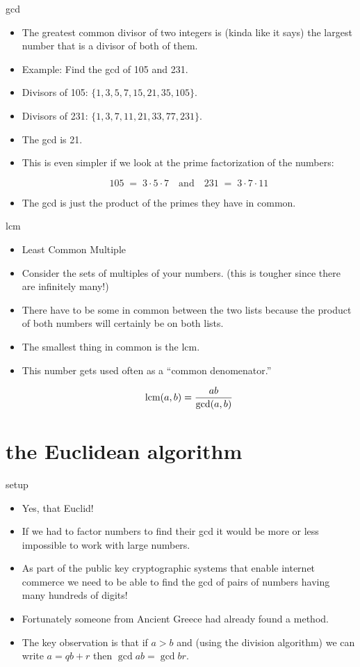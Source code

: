 \documentclass[landscape]{beamer}
\begin{document}
\begin{frame}{gcd}
\begin{itemize}
\item The greatest common divisor of two integers is (kinda like it says) the largest number that is a divisor of both of them. \pause
\item Example: Find the gcd of 105 and 231.\pause 
\item Divisors of 105: $\{1, 3, 5, 7, 15, 21, 35, 105 \}$.
\item Divisors of 231: $\{1, 3, 7, 11, 21, 33, 77, 231 \}$. \pause
\item The gcd is 21. \pause
\item This is even simpler if we look at the prime factorization of the numbers:

\[ 105 \; = \; 3 \cdot 5 \cdot 7 \quad \mbox{and} \quad 231 \; = \; 3 \cdot 7 \cdot 11 \]
\pause 
\item The gcd is just the product of the primes they have in common.
\end{itemize}
\end{frame}

\begin{frame}{lcm}
\begin{itemize}
\item Least Common Multiple\pause
\item Consider the sets of multiples of your numbers. (this is tougher since there are infinitely many!)\pause 
\item There have to be some in common between the two lists because the product of both numbers will certainly be on both lists.\pause
\item The smallest thing in common is the lcm.\pause
\item This number gets used often as a ``common denomenator.'' \pause

\[ \mbox{lcm} (a, b) = \frac{ab}{\mbox{gcd} (a, b)} \]
\end{itemize}
\end{frame}

\section{the Euclidean algorithm}

\begin{frame}{setup}
\begin{itemize}
\item Yes, that Euclid! \pause
\item If we had to factor numbers to find their gcd it would be more or less impossible to work with large numbers.\pause
\item As part of the public key cryptographic systems that enable internet commerce we need to be able to find the gcd of pairs of numbers having many hundreds of digits! \pause
\item Fortunately someone from Ancient Greece had already found a method. \pause
\item The key observation is that if $a > b$ and (using the division algorithm) we can write $a =qb+r$ then $\gcd{a}{b} = \gcd{b}{r}$. 
\end{itemize}
\end{frame}
\end{document}

